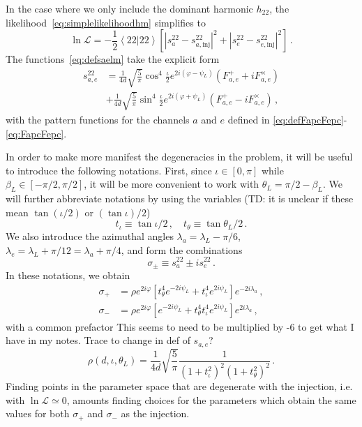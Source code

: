 \documentclass[aps,showpacs,twocolumn,prd,superscriptaddress,nofootinbib]{revtex4-1}
\newcommand{\be}{\begin{equation}}
\newcommand{\ee}{\end{equation}}
\newcommand{\bsub}{\begin{subequations}}
\newcommand{\esub}{\end{subequations}}
\newcommand\calL{{\mathcal{L}}}
\newcommand\psiL{{\psi_{L}}}
\newcommand{\jgb}[1]{{\color{DarkGreen} #1}}
\newcommand{\tdc}[1]{{\color{red} (TD: #1)}}
\begin{document}
In the case where we only include the dominant harmonic $h_{22}$, the likelihood~\eqref{eq:simplelikelihoodhm} simplifies to
\be\label{eq:simplelikelihood22}
	\ln \calL = -\frac{1}{2} \left\langle 22 | 22 \right\rangle  \left[ \left| s_{a}^{22} - s_{a, \mathrm{inj}}^{22} \right|^{2} + \left| s_{e}^{22} - s_{e, \mathrm{inj}}^{22}\right|^{2} \right] \,.
\ee
The functions~\eqref{eq:defsaelm} take the explicit form
\begin{align}
	s_{a,e}^{22} &= \frac{1}{4d} \sqrt{\frac{5}{\pi}} \cos^{4}\frac{\iota}{2} e^{2i(\varphi-\psiL)} \left( F_{a,e}^{+} + i F_{a,e}^{\times} \right) \\
	&+ \frac{1}{4d} \sqrt{\frac{5}{\pi}} \sin^{4}\frac{\iota}{2} e^{2i(\varphi+\psiL)} \left( F_{a,e}^{+} - i F_{a,e}^{\times} \right) \,,
\end{align}
with the pattern functions for the channels $a$ and $e$ defined in \eqref{eq:defFapcFepc}-\eqref{eq:FapcFepc}.

In order to make more manifest the degeneracies in the problem, it will be useful to introduce the following notations. First, since $\iota \in [0, \pi]$ while $\beta_{L} \in [-\pi/2, \pi/2]$, it will be more convenient to work with $\theta_{L} = \pi/2 - \beta_{L}$. We will further abbreviate notations by using the variables
\tdc{it is unclear if these mean $\tan (\iota/2)$ or $(\tan \iota)/2$}
\be
	t_{\iota} \equiv \tan \iota/2 \,, \quad t_{\theta} \equiv \tan \theta_{L} / 2 \,.
\ee
We also introduce the azimuthal angles $\lambda_{a} = \lambda_{L} - \pi/6$, $\lambda_{e} = \lambda_{L} + \pi/12 = \lambda_{a} + \pi/4$, and form the combinations
\be
	\sigma_{\pm} \equiv s_{a}^{22} \pm i s_{e}^{22} \,.
\ee
In these notations, we obtain
\bsub\label{eq:sigmapm}
\begin{align}
	\sigma_{+} &= \rho e^{2i\varphi} \left[ t_{\theta}^{4} e^{-2 i \psiL} + t_{\iota}^{4} e^{2 i \psiL} \right] e^{-2i \lambda_{a}} \,, \\
	\sigma_{-} &= \rho e^{2i\varphi} \left[ e^{-2 i \psiL} + t_{\theta}^{4} t_{\iota}^{4} e^{2 i \psiL} \right] e^{2i \lambda_{a}} \,,
\end{align}
\esub
with a common prefactor \jgb{This seems to need to  be multiplied by -6 to get what I have in my notes. Trace to change in def of $s_{a,e}$?}
\be\label{eq:sigmafactorrho}
	\rho(d, \iota, \theta_{L}) = \frac{1}{4d} \sqrt{\frac{5}{\pi}} \frac{1}{\left( 1 + t_{\iota}^{2} \right)^{2} \left(1 + t_{\theta}^{2} \right)^{2}} \,.
\ee
Finding points in the parameter space that are degenerate with the injection, i.e. with $\ln \calL \simeq 0$, amounts finding choices for the parameters which obtain the same values for both  $\sigma_{+}$ and $\sigma_{-}$ as the injection.
\end{document}
